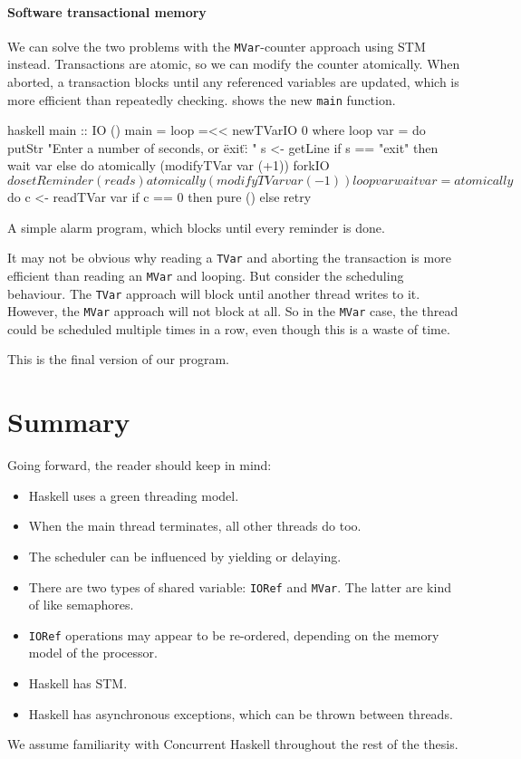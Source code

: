 \paragraph{Software transactional memory}
We can solve the two problems with the \verb|MVar|-counter approach
using STM instead.  Transactions are atomic, so we can modify the
counter atomically.  When aborted, a transaction blocks until any
referenced variables are updated, which is more efficient than
repeatedly checking.   shows the new \verb|main|
function.

\begin{listing}
\centering
\begin{cminted}{haskell}
main :: IO ()
main = loop =<< newTVarIO 0 where
  loop var = do
    putStr "Enter a number of seconds, or \"exit\": "
    s <- getLine
    if s == "exit"
      then wait var
      else do
        atomically (modifyTVar var (+1))
        forkIO $ do
          setReminder (read s)
          atomically (modifyTVar var (-1))
        loop var
  wait var = atomically $ do
    c <- readTVar var
    if c == 0 then pure () else retry
\end{cminted}
\caption{A simple alarm program, which blocks until every reminder is done.}\label{lst:ch_ex5}
\end{listing}

It may not be obvious why reading a \verb|TVar| and aborting the
transaction is more efficient than reading an \verb|MVar| and looping.
But consider the scheduling behaviour.  The \verb|TVar| approach will
block until another thread writes to it.  However, the \verb|MVar|
approach will not block at all.  So in the \verb|MVar| case, the
thread could be scheduled multiple times in a row, even though this is
a waste of time.

This is the final version of our program.

\vfill\pagebreak

\section{Summary}

Going forward, the reader should keep in mind:

\begin{itemize}
\item Haskell uses a green threading model.
\item When the main thread terminates, all other threads do too.
\item The scheduler can be influenced by yielding or delaying.
\item There are two types of shared variable: \verb|IORef| and
  \verb|MVar|.  The latter are kind of like semaphores.
\item \verb|IORef| operations may appear to be re-ordered, depending
  on the memory model of the processor.
\item Haskell has STM.
\item Haskell has asynchronous exceptions, which can be thrown between
  threads.
\end{itemize}

We assume familiarity with Concurrent Haskell throughout the rest of
the thesis.
